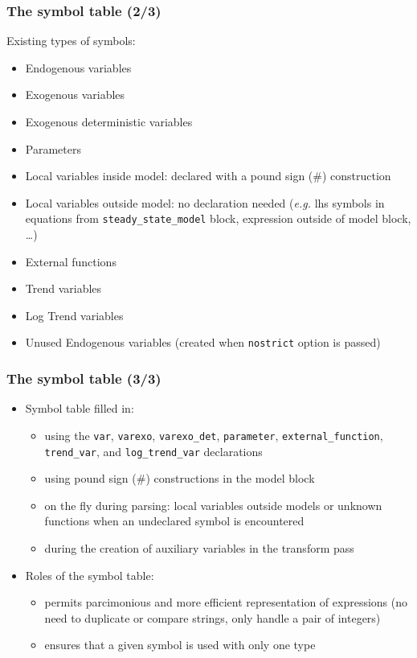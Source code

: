 \documentclass{beamer}
\begin{document}
\begin{frame}
  \frametitle{The symbol table (2/3)}
  Existing types of symbols:
  \begin{itemize}
  \item Endogenous variables
  \item Exogenous variables
  \item Exogenous deterministic variables
  \item Parameters
  \item Local variables inside model: declared with a pound sign (\#) construction
  \item Local variables outside model: no declaration needed (\textit{e.g.} lhs symbols in equations from \texttt{steady\_state\_model} block, expression outside of model block, \ldots)
  \item External functions
  \item Trend variables
  \item Log Trend variables
  \item Unused Endogenous variables (created when \texttt{nostrict} option is passed)
  \end{itemize}
\end{frame}

\begin{frame}
  \frametitle{The symbol table (3/3)}
  \begin{itemize}
  \item Symbol table filled in:
    \begin{itemize}
    \item using the \texttt{var}, \texttt{varexo}, \texttt{varexo\_det}, \texttt{parameter}, \texttt{external\_function}, \texttt{trend\_var}, and \texttt{log\_trend\_var} declarations
    \item using pound sign (\#) constructions in the model block
    \item on the fly during parsing: local variables outside models or unknown functions when an undeclared symbol is encountered
    \item during the creation of auxiliary variables in the transform pass
    \end{itemize}
  \item Roles of the symbol table:
    \begin{itemize}
    \item permits parcimonious and more efficient representation of expressions (no need to duplicate or compare strings, only handle a pair of integers)
    \item ensures that a given symbol is used with only one type
    \end{itemize}
  \end{itemize}
\end{frame}
\end{document}
